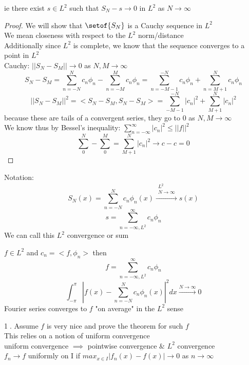 \documentclass[answers,12pt,addpoints]{exam}
\begin{document}
\begin{theorem}
\begin{theorem}
        ie there exist $s \in L^2$ such that $S_N - s \to 0 $ in $L^2$ as $N \to \infty$
        \begin{proof}
            We will show that $\setof{S_N}$ is a Cauchy sequence in $L^2$\\
            We mean closeness with respect to the $L^2$ norm/distance\\
            Additionally since $L^2$ is complete, we know that the sequence converges to a point in $L^2$\\
            Cauchy: $||S_N - S_M|| \to 0$ as $N,M \to \infty$\\
            $$S_N - S_M = \sum_{n=-N}^{N} c_n \phi_n - \sum_{n=-M}^{M} c_n \phi_n = \sum_{n=-M-1}^{-N} c_n \phi_n + \sum_{n=M+1}^{N} c_n \phi_n$$
            $$ ||S_N - S_M||^2 = < S_N - S_M, S_N - S_M> = \sum_{-M-1}^{-N} |c_n|^2 + \sum_{M+1}^{N} |c_n|^2$$
            because these are tails of a convergent series, they go to 0 as $N,M \to \infty$\\
            We know thus by Bessel's inequality: $\sum_{n=-\infty}^{\infty} |c_n|^2 \leq ||f||^2$\\
            $$ \sum_0^N - \sum_0^M = \sum_{M+1}^{N} |c_n|^2 \to c - c = 0$$
        \end{proof}
    \end{theorem}
    \begin{remark}
        Notation:
        $$S_N(x) = \sum_{n=-N}^{N} c_n \phi_n(x) \xrightarrow{\substack{L^2 \\ N \to \infty}} s(x)$$
        $$s = \sum_{n=-\infty, L^2}^{\infty} c_n \phi_n$$
        We can call this $L^2$ convergence or sum
    \end{remark}
    \begin{theorem}
        $f \in L^2$ and $c_n = <f, \phi_n>$ then\\
        $$f = \sum_{n=-\infty, L^2}^{\infty} c_n \phi_n$$
        $$\int_{-\pi}^{\pi} |f(x) - \sum_{n=-N}^{N} c_n \phi_n(x)|^2 dx \xrightarrow{N \to \infty} 0$$
        Fourier series converges to $f$ "on average" in the $L^2$ sense
    \end{theorem}
    \begin{remark}
        \textcircled{1}. Assume $f$ is very nice and prove the theorem for such $f$\\
        This relies on a notion of uniform convergence\\
        uniform convergence $\implies$ pointwise convergence $\&$ $L^2$ convergence\\
        $f_n \to f$ uniformly on I if $max_{x \in I} |f_n(x) - f(x)| \to 0$ as $n \to \infty$\\

\end{remark}
\end{theorem}
\end{document}
